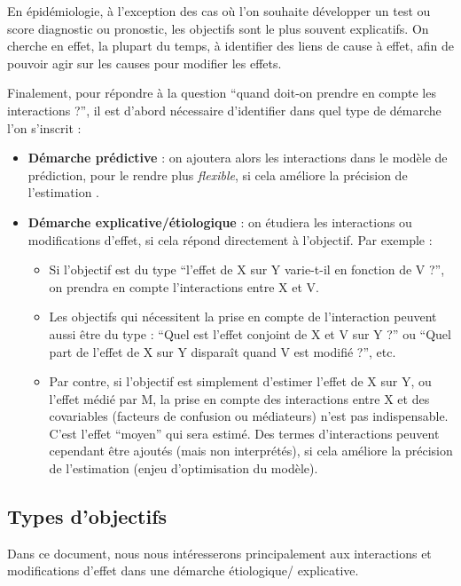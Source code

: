 \documentclass[
]{book}
\providecommand{\tightlist}{%
  \setlength{\itemsep}{0pt}\setlength{\parskip}{0pt}}
\begin{document}
En épidémiologie, à l'exception des cas où l'on souhaite développer un test ou score diagnostic ou pronostic, les objectifs sont le plus souvent explicatifs. On cherche en effet, la plupart du temps, à identifier des liens de cause à effet, afin de pouvoir agir sur les causes pour modifier les effets.

Finalement, pour répondre à la question ``quand doit-on prendre en compte les interactions ?'', il est d'abord nécessaire d'identifier dans quel type de démarche l'on s'inscrit :

\begin{itemize}
\tightlist
\item
  \textbf{Démarche prédictive} : on ajoutera alors les interactions dans le modèle de prédiction, pour le rendre plus \emph{flexible}, si cela améliore la précision de l'estimation \citet{vanderweele_tutorial_2014}.
\item
  \textbf{Démarche explicative/étiologique} : on étudiera les interactions ou modifications d'effet, si cela répond directement à l'objectif. Par exemple :

  \begin{itemize}
  \tightlist
  \item
    Si l'objectif est du type ``l'effet de X sur Y varie-t-il en fonction de V ?'', on prendra en compte l'interactions entre X et V.
  \item
    Les objectifs qui nécessitent la prise en compte de l'interaction peuvent aussi être du type : ``Quel est l'effet conjoint de X et V sur Y ?'' ou ``Quel part de l'effet de X sur Y disparaît quand V est modifié ?'', etc.
  \item
    Par contre, si l'objectif est simplement d'estimer l'effet de X sur Y, ou l'effet médié par M, la prise en compte des interactions entre X et des covariables (facteurs de confusion ou médiateurs) n'est pas indispensable. C'est l'effet ``moyen'' qui sera estimé. Des termes d'interactions peuvent cependant être ajoutés (mais non interprétés), si cela améliore la précision de l'estimation (enjeu d'optimisation du modèle).
  \end{itemize}
\end{itemize}

\hypertarget{types-dobjectifs}{%
\subsection{Types d'objectifs}\label{types-dobjectifs}}

Dans ce document, nous nous intéresserons principalement aux interactions et modifications d'effet dans une démarche étiologique/ explicative.
\end{document}
